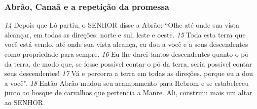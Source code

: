 \bigskip
\subsubsection*{Abrão, Canaã e a repetição da promessa}
\textit{\tiny 14}
Depois que Ló partiu, o SENHOR disse a Abrão: “Olhe até onde sua vista
alcançar, em todas as direções: norte e sul, leste e oeste. 
\textit{\tiny 15}
Toda esta terra que
você está vendo, até onde sua vista alcança, eu dou a você e a seus descendentes
como propriedade para sempre. 
\textit{\tiny 16}
Eu lhe darei tantos descendentes quanto o pó
da terra, de modo que, se fosse possível contar o pó da terra, seria possível contar
seus descendentes! 
\textit{\tiny 17}
Vá e percorra a terra em todas as direções, porque eu a dou
a você”.
\textit{\tiny 18}
Então Abrão mudou seu acampamento para Hebrom e se estabeleceu junto
ao bosque de carvalhos que pertencia a Manre. Ali, construiu mais um altar ao
SENHOR.


\bigskip
